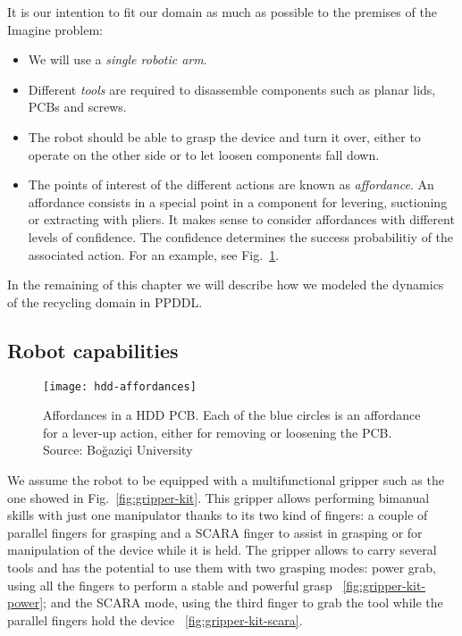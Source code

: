 \documentclass[../root.tex]{subfiles}
\begin{document}
It is our intention to fit our domain as much as possible to the
premises of the Imagine problem:
\begin{itemize}
	\item We will use a \emph{single robotic arm}.
	\item Different \emph{tools} are required to disassemble components such as
	planar lids, PCBs and screws.
	\item The robot should be able to grasp the device and turn it over, either
	to operate on the other side or to let loosen components fall down.
	\item The points of interest of the different actions are known as
	\emph{affordance}. An affordance consists in a special point in
	a component for levering, suctioning or extracting with pliers.
	It makes sense to consider affordances with different levels of
	confidence. The confidence determines the success probabilitiy of the
	associated action. For an example, see Fig.~\ref{fig:hdd-affordances}.
\end{itemize}

In the remaining of this chapter we will describe how we modeled 
the dynamics of the recycling domain in PPDDL.

\subsection{Robot capabilities}

\begin{figure}[tbp]
	\centering
	\texttt{[image: hdd-affordances]}
	\caption{Affordances in a HDD PCB. Each of the blue
		circles is an affordance for a lever-up action, either for
		removing or loosening the PCB. Source: Boğaziçi University}
	\label{fig:hdd-affordances}
\end{figure}

We assume the robot to be equipped with a multifunctional gripper such as the
one showed in Fig.~\ref{fig:gripper-kit}. This gripper allows performing
bimanual skills with just one manipulator thanks to its two kind
of fingers: a couple of parallel fingers for grasping
and a SCARA finger to assist in grasping or for manipulation of
the device while it is held.
The gripper allows to carry several
tools and has the potential to use them with two grasping modes:
power grab, using all the fingers to perform a stable and powerful grasp%
~\ref{fig:gripper-kit-power}; and the SCARA mode, using the third finger
to grab the tool while the parallel fingers hold the device%
~\ref{fig:gripper-kit-scara}.
\end{document}
